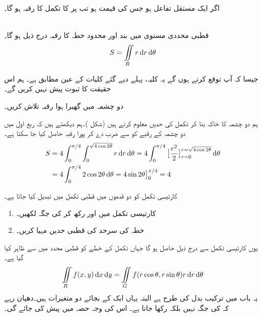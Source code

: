 اگر  ایک مستقل تفاعل ہو جس کی قیمت  ہو  تب  پر  کا تکمل  کا رقبہ ہو گا۔

\\
قطبی محددی مستوی میں بند اور محدود خطہ  کا  رقبہ درج ذیل ہو گا۔
\begin{align}
S=\iint\limits_R r\dif r\dif\theta
\end{align}

جیسا  کہ آپ توقع کرتے ہوں گے یہ کلیہ، پہلے دیے گئے کلیات کے عین مطابق ہے۔ ہم اس حقیقت کا ثبوت پیش نہیں کریں گے۔

دو  چشمہ  میں گھیرا ہوا  رقبہ تلاش کریں۔

ہم دو چشمہ کا خاکہ بنا کر تکمل کی حدیں معلوم کرتے ہیں (شکل )۔ہم دیکھتے ہیں کہ ربع اول میں دو چشمہ کے رقبے  کو  سے ضرب دے کر پورا رقبہ حاصل کیا جا سکتا ہے۔
\begin{align*}
S&=4\int_{0}^{\pi/4}\int_0^{\sqrt{4\cos2\theta}}r\dif r\dif \theta=4\int_0^{\pi/4}\big[\frac{r^2}{2}\big]_{r=0}^{r=\sqrt{4\cos2\theta}}\dif\theta\\
&=4\int_0^{\pi/4}2\cos2\theta\dif\theta=4\sin2\theta\big]_0^{\pi/4}=4
\end{align*}

کارتیسی تکمل  کو    دو قدموں میں قطبی تکمل میں تبدیل کیا جاتا ہے۔
\begin{enumerate}[1.]
\item
کارتیسی تکمل میں   اور رکھ کر  کی جگہ  لکھیں۔
\item
خطہ  کی سرحد کی قطبی حدیں مہیا کریں۔
\end{enumerate}
 
یوں کارتیسی تکمل سے درج ذیل حاصل ہو گا جہاں تکمل کے خطے  کو قطبی محدد میں  سے ظاہر کیا گیا ہے۔
\begin{align}\label{مساوات_بالکثرت_قطبی_محدد_میں_رقبہ_کی_عمومی}
\iint\limits_R f(x,y)\dif x\dif y=\iint\limits_G f(r\cos\theta,r\sin\theta)r\dif r\dif \theta
\end{align}
یہ  باب  میں ترکیب بدل کی طرح ہے البتہ یہاں ایک کے بجائے دو متغیرات ہیں۔دھیان رہے کہ  کی جگہ  نہیں بلکہ  رکھا  جاتا ہے۔ اس کی وجہ حصہ    میں پیش کی جائے گی۔

